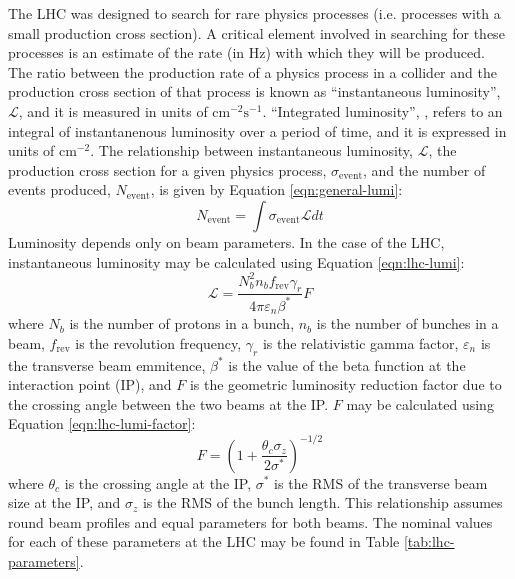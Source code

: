 The LHC was designed to search for rare physics processes (i.e.
processes with a small production cross section).  A critical 
element involved in searching for these processes is an estimate
of the rate (in Hz) with which they will be produced.  The ratio
between the production rate of a physics process in a collider and the
production cross section of that process is known as ``instantaneous luminosity'', $\mathcal{L}$, 
and it is measured in units of $\text{cm}^{-2}\text{s}^{-1}$.  
``Integrated luminosity'', \Lint, refers to an integral of instantanenous luminosity
over a period of time, and it is expressed in units of $\text{cm}^{-2}$.
The relationship between instantaneous luminosity, $\mathcal{L}$, 
the production cross section for a given physics process, $\sigma_{\text{event}}$, 
and the number of events produced, $N_{\text{event}}$, is given by Equation \ref{eqn:general-lumi}:
\begin{equation}
  N_{\text{event}} = \int\sigma_{\text{event}} \mathcal{L} dt
  \label{eqn:general-lumi}
\end{equation}
Luminosity depends only on beam parameters.  In the case of the LHC,
instantaneous luminosity may be calculated using Equation \ref{eqn:lhc-lumi}:
\begin{equation}
  \mathcal{L} = \frac{N_b^2n_bf_{\text{rev}} \gamma_r }{4\pi\varepsilon_n\beta^{*}} F
  \label{eqn:lhc-lumi}
\end{equation}
where 
$N_b$ is the number of protons in a bunch,
$n_b$ is the number of bunches in a beam,
$f_{\text{rev}}$ is the revolution frequency,
$\gamma_r$ is the relativistic gamma factor,
$\varepsilon_n$ is the transverse beam emmitence,
$\beta^{*}$ is the value of the beta function at the interaction point (IP),
and $F$ is the geometric luminosity reduction factor due to the crossing
angle between the two beams at the IP.  $F$ may be calculated using
Equation \ref{eqn:lhc-lumi-factor}:
\begin{equation}
  F = \left(1 + \frac{\theta_c\sigma_z}{2\sigma^{*}}\right)^{-1/2}
  \label{eqn:lhc-lumi-factor}
\end{equation}
where 
$\theta_c$ is the crossing angle at the IP,
$\sigma^*$ is the RMS of the transverse beam size at the IP, and
$\sigma_z$ is the RMS of the bunch length.  This relationship 
assumes round beam profiles and equal parameters for both beams.
The nominal values for each of these parameters at the LHC may be found in
Table \ref{tab:lhc-parameters}.

